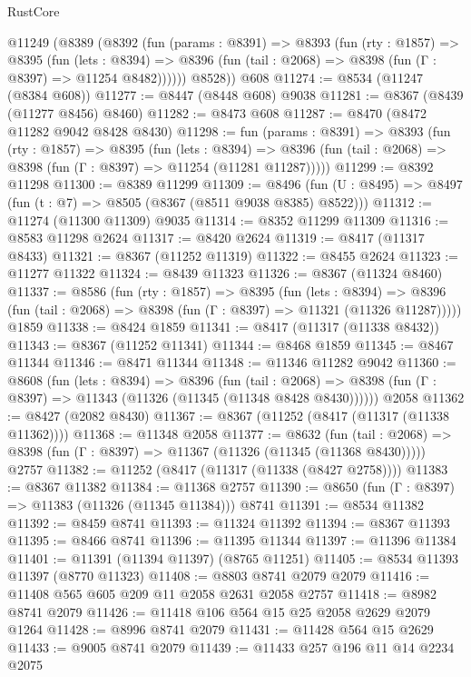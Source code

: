 \begin{lexlean}{RustCore}
\begin{coremodule}
    @11249
      (@8389
        (@8392
          (fun (params : @8391) =>
          @8393
            (fun (rty : @1857) =>
            @8395
              (fun (lets : @8394) =>
              @8396 (fun (tail : @2068) => @8398 (fun (Γ : @8397) => @11254 @8482))))))
        @8528))
    @608
@11274 := @8534 (@11247 (@8384 @608))
@11277 := @8447 (@8448 @608) @9038
@11281 := @8367 (@8439 (@11277 @8456) @8460)
@11282 := @8473 @608
@11287 := @8470 (@8472 @11282 @9042 @8428 @8430)
@11298 := fun (params : @8391) =>
  @8393
    (fun (rty : @1857) =>
    @8395
      (fun (lets : @8394) =>
      @8396 (fun (tail : @2068) => @8398 (fun (Γ : @8397) => @11254 (@11281 @11287)))))
@11299 := @8392 @11298
@11300 := @8389 @11299
@11309 := @8496 (fun (U : @8495) => @8497 (fun (t : @7) => @8505 (@8367 (@8511 @9038 @8385) @8522)))
@11312 := @11274 (@11300 @11309) @9035
@11314 := @8352 @11299 @11309
@11316 := @8583 @11298 @2624
@11317 := @8420 @2624
@11319 := @8417 (@11317 @8433)
@11321 := @8367 (@11252 @11319)
@11322 := @8455 @2624
@11323 := @11277 @11322
@11324 := @8439 @11323
@11326 := @8367 (@11324 @8460)
@11337 := @8586
    (fun (rty : @1857) =>
    @8395
      (fun (lets : @8394) =>
      @8396 (fun (tail : @2068) => @8398 (fun (Γ : @8397) => @11321 (@11326 @11287)))))
    @1859
@11338 := @8424 @1859
@11341 := @8417 (@11317 (@11338 @8432))
@11343 := @8367 (@11252 @11341)
@11344 := @8468 @1859
@11345 := @8467 @11344
@11346 := @8471 @11344
@11348 := @11346 @11282 @9042
@11360 := @8608
    (fun (lets : @8394) =>
    @8396
      (fun (tail : @2068) =>
      @8398 (fun (Γ : @8397) => @11343 (@11326 (@11345 (@11348 @8428 @8430))))))
    @2058
@11362 := @8427 (@2082 @8430)
@11367 := @8367 (@11252 (@8417 (@11317 (@11338 @11362))))
@11368 := @11348 @2058
@11377 := @8632
    (fun (tail : @2068) => @8398 (fun (Γ : @8397) => @11367 (@11326 (@11345 (@11368 @8430)))))
    @2757
@11382 := @11252 (@8417 (@11317 (@11338 (@8427 @2758))))
@11383 := @8367 @11382
@11384 := @11368 @2757
@11390 := @8650 (fun (Γ : @8397) => @11383 (@11326 (@11345 @11384))) @8741
@11391 := @8534 @11382
@11392 := @8459 @8741
@11393 := @11324 @11392
@11394 := @8367 @11393
@11395 := @8466 @8741
@11396 := @11395 @11344
@11397 := @11396 @11384
@11401 := @11391 (@11394 @11397) (@8765 @11251)
@11405 := @8534 @11393 @11397 (@8770 @11323)
@11408 := @8803 @8741 @2079 @2079
@11416 := @11408 @565 @605 @209 @11 @2058 @2631 @2058 @2757
@11418 := @8982 @8741 @2079
@11426 := @11418 @106 @564 @15 @25 @2058 @2629 @2079 @1264
@11428 := @8996 @8741 @2079
@11431 := @11428 @564 @15 @2629
@11433 := @9005 @8741 @2079
@11439 := @11433 @257 @196 @11 @14 @2234 @2075

\end{coremodule}
\end{lexlean}
